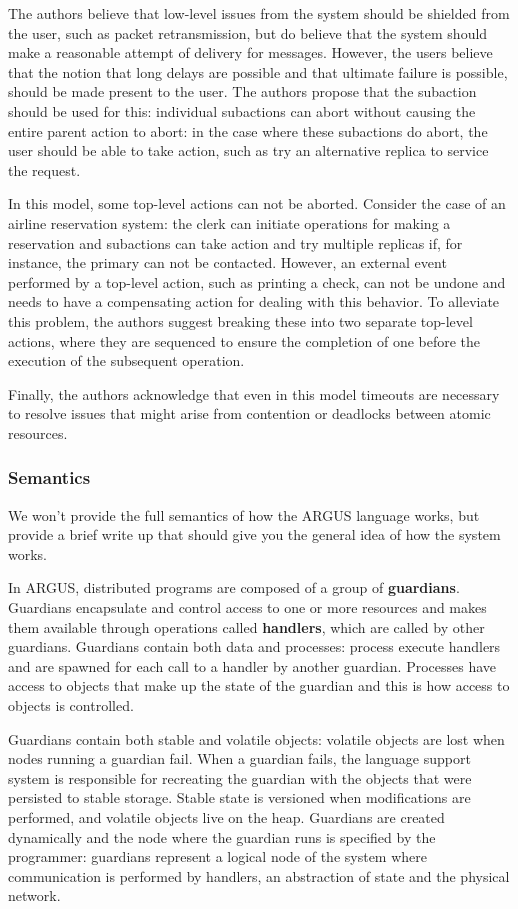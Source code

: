 The authors believe that low-level issues from the system should be shielded from the user, such as packet retransmission, but do believe that the system should make a reasonable attempt of delivery for messages.  However, the users believe that the notion that long delays are possible and that ultimate failure is possible, should be made present to the user.  The authors propose that the subaction should be used for this: individual subactions can abort without causing the entire parent action to abort: in the case where these subactions do abort, the user should be able to take action, such as try an alternative replica to service the request.  

In this model, some top-level actions can not be aborted.  Consider the case of an airline reservation system: the clerk can initiate operations for making a reservation and subactions can take action and try multiple replicas if, for instance, the primary can not be contacted.  However, an external event performed by a top-level action, such as printing a check, can not be undone and needs to have a compensating action for dealing with this behavior.  To alleviate this problem, the authors suggest breaking these into two separate top-level actions, where they are sequenced to ensure the completion of one before the execution of the subsequent operation.

Finally, the authors acknowledge that even in this model timeouts are necessary to resolve issues that might arise from contention or deadlocks between atomic resources.  

\subsubsection{Semantics}

We won't provide the full semantics of how the ARGUS language works, but provide a brief write up that should give you the general idea of how the system works.

In ARGUS, distributed programs are composed of a group of \textbf{guardians}.  Guardians encapsulate and control access to one or more resources and makes them available through operations called \textbf{handlers}, which are called by other guardians.  Guardians contain both data and processes: process execute handlers and are spawned for each call to a handler by another guardian. Processes have access to objects that make up the state of the guardian and this is how access to objects is controlled.

Guardians contain both stable and volatile objects: volatile objects are lost when nodes running a guardian fail.  When a guardian fails, the language support system is responsible for recreating the guardian with the objects that were persisted to stable storage.  Stable state is versioned when modifications are performed, and volatile objects live on the heap.  Guardians are created dynamically and the node where the guardian runs is specified by the programmer: guardians represent a logical node of the system where communication is performed by handlers, an abstraction of state and the physical network.

